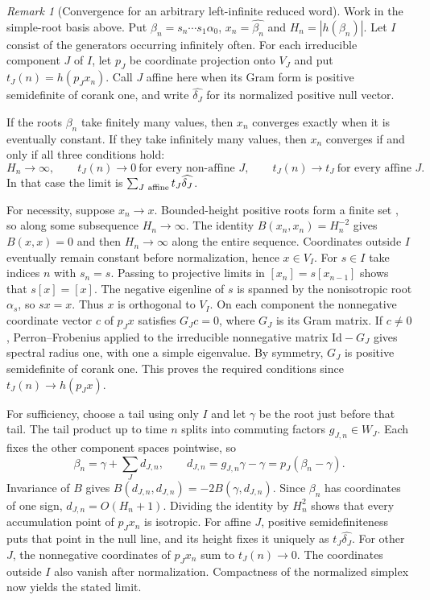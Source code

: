 \documentclass[11pt,reqno]{amsart}
\theoremstyle{plain}
\theoremstyle{definition}
\theoremstyle{remark}
\newtheorem{remark}[theorem]{Remark}
\numberwithin{equation}{section}
\begin{document}
\begin{remark}[Convergence for an arbitrary left-infinite reduced word]
\label{rem:word-component-weights}
Work in the simple-root basis above. Put
$\beta_n=s_n\cdots s_1\alpha_0$, $x_n=\widehat{\beta_n}$ and
$H_n=|h(\beta_n)|$. Let $I$ consist of the generators occurring
infinitely often. For each irreducible component $J$ of $I$, let
$p_J$ be coordinate projection onto $V_J$ and put $t_J(n)=h(p_Jx_n)$.
Call $J$ affine here when its Gram form is positive semidefinite
of corank one, and write $\widehat{\delta_J}$ for its normalized
positive null vector.

If the roots $\beta_n$ take finitely many values, then $x_n$ converges
exactly when it is eventually constant. If they take infinitely many
values, then $x_n$ converges if and only if all three conditions hold:
\[
 H_n\to\infty,\qquad
 t_J(n)\to0\ \text{for every non-affine }J,\qquad
 t_J(n)\to t_J\ \text{for every affine }J.
\]
In that case the limit is $\sum_{J\ {\rm affine}}t_J\widehat{\delta_J}$.

For necessity, suppose $x_n\to x$. Bounded-height positive roots
form a finite set \cite[Corollary~2.11]{HLR}, so along some subsequence
$H_n\to\infty$. The identity $B(x_n,x_n)=H_n^{-2}$ gives $B(x,x)=0$
and then $H_n\to\infty$ along the entire sequence. Coordinates outside
$I$ eventually remain constant before normalization, hence $x\in V_I$.
For $s\in I$ take indices $n$ with $s_n=s$. Passing to projective
limits in $[x_n]=s[x_{n-1}]$ shows that $s[x]=[x]$.
The negative eigenline of $s$ is spanned by the nonisotropic root
$\alpha_s$, so $sx=x$. Thus $x$ is orthogonal to $V_I$.
On each component the nonnegative coordinate vector $c$ of $p_Jx$
satisfies $G_Jc=0$, where $G_J$ is its Gram matrix.
If $c\ne0$, Perron--Frobenius applied to the irreducible nonnegative
matrix $\mathrm{Id}-G_J$ gives spectral radius one, with one a simple
eigenvalue. By symmetry, $G_J$ is positive semidefinite of corank one.
This proves the required conditions since $t_J(n)\to h(p_Jx)$.

For sufficiency, choose a tail using only $I$ and let $\gamma$ be the
root just before that tail. The tail product up to time $n$ splits into
commuting factors $g_{J,n}\in W_J$. Each fixes the other component
spaces pointwise, so
\[
 \beta_n=\gamma+\sum_J d_{J,n},\qquad
 d_{J,n}=g_{J,n}\gamma-\gamma=p_J(\beta_n-\gamma).
\]
Invariance of $B$ gives
$B(d_{J,n},d_{J,n})=-2B(\gamma,d_{J,n})$.
Since $\beta_n$ has coordinates of one sign, $d_{J,n}=O(H_n+1)$.
Dividing the identity by $H_n^2$ shows that every accumulation
point of $p_Jx_n$ is isotropic. For affine $J$, positive semidefiniteness
puts that point in the null line, and its height fixes it uniquely
as $t_J\widehat{\delta_J}$. For other $J$, the nonnegative coordinates
of $p_Jx_n$ sum to $t_J(n)\to0$. The coordinates outside $I$ also
vanish after normalization. Compactness of the normalized simplex
now yields the stated limit.
\end{remark}
\end{document}
